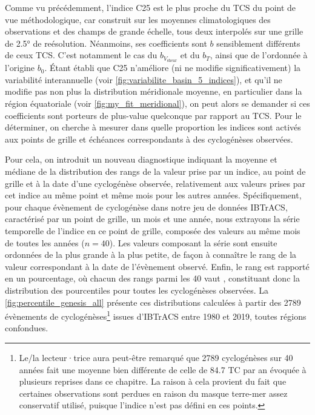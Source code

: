 \documentclass[../main.tex]{subfiles}
\begin{document}
Comme vu précédemment, l'indice C25 est le plus proche du TCS du point de vue méthodologique, car construit sur les moyennes climatologiques des observations et
des champs de grande échelle, tous deux interpolés sur une grille de \ang{2.5} de reésolution. Néanmoins, ses coefficients sont $b$ sensiblement différents de ceux TCS.
C'est notamment le cas du $b_{V_{\mathrm{shear}}}$ et du $b_T$, ainsi que de l'ordonnée à l'origine $b_0$. Étant établi que C25 n'améliore (ni ne modifie
significativement) la variabilité interannuelle (voir \cref{fig:variabilite_basin_5_indices}), et qu'il ne modifie pas non plus la distribution méridionale
moyenne, en particulier dans la région équatoriale (voir \cref{fig:my_fit_meridional}), on peut alors se demander si ces coefficients sont porteurs de
plus-value quelconque par rapport au TCS. Pour le déterminer, on cherche à mesurer dans quelle proportion les indices sont activés aux points de grille et
échéances correspondants à des cyclogénèses observées.

Pour cela, on introduit un nouveau diagnostique indiquant la moyenne et médiane de la distribution des rangs de la valeur prise par un indice, au point de
grille et à la date d'une cyclogénèse observée, relativement aux valeurs prises par cet indice au même point et même mois pour les autres années.
Spécifiquement, pour chaque évènement de cyclogénèse dans notre jeu de données IBTrACS, caractérisé par un point de grille, un mois et une année, nous extrayons
la série temporelle de l'indice en ce point de grille, composée des valeurs au même mois de toutes les années ($n = \num{40}$). Les valeurs composant la série
sont ensuite ordonnées de la plus grande à la plus petite, de façon à connaître le rang de la valeur correspondant à la date de l'évènement observé. Enfin, le
rang est rapporté en un pourcentage, où chacun des rangs parmi les \num{40} vaut , constituant donc la distribution des pourcentiles pour toutes les
cyclogénèses observées. La \cref{fig:percentile_genesis_all} présente ces distributions calculées à partir des \num{2789} évènements de
cyclogénèses\footnote{Le/la lecteur·trice aura peut-être remarqué que \num{2789} cyclogénèses sur \num{40} années fait une moyenne bien différente de celle de
\num{84.7} TC par an évoquée à plusieurs reprises dans ce chapitre. La raison à cela provient du fait que certaines observations sont perdues en raison du
masque terre-mer assez conservatif utilisé, puisque l'indice n'est pas défini en ces points.} issues d'IBTrACS entre \num{1980} et \num{2019}, toutes
régions confondues.
\end{document}
